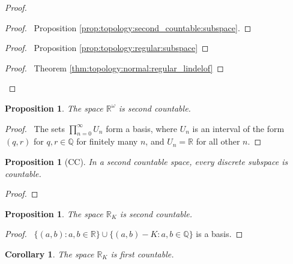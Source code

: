 \documentclass{report}
\let\qed\relax
\newtheorem{prop}[lm]{Proposition}
\newtheorem{cor}{Corollary}[lm]
\theoremstyle{definition}
\begin{document}
  \begin{proof}
   \pf
   \begin{proof}
     \pf\ Proposition \ref{prop:topology:second_countable:subspace}.
   \end{proof}
   \begin{proof}
     \pf\ Proposition \ref{prop:topology:regular:subspace}
   \end{proof}
   \begin{proof}
     \pf\ Theorem \ref{thm:topology:normal:regular_lindelof}
   \end{proof}
   \qed
  \end{proof}

   \begin{prop}
   The space $\mathbb{R}^\omega$ is second countable.
 \end{prop}

 \begin{proof}
   \pf\ The sets $\prod_{n=0}^\infty U_n$ form a basis, where $U_n$ is an
   interval of the form $(q, r)$ for $q, r \in \mathbb{Q}$ for finitely many
   $n$, and $U_n = \mathbb{R}$ for all other $n$. \qed
 \end{proof}

  \begin{prop}[CC]
  In a second countable space, every discrete subspace is countable.
 \end{prop}

 \begin{proof}
  \pf
  \qed
 \end{proof}

 \begin{prop}
  The space $\mathbb{R}_K$ is second countable.
\end{prop}

\begin{proof}
  \pf\ $\{ (a,b) : a, b \in \mathbb{R} \} \cup \{ (a, b) - K : a, b \in
  \mathbb{Q} \}$ is a basis. \qed
\end{proof}

\begin{cor}
  The space $\mathbb{R}_K$ is first countable.
\end{cor}
\end{document}
